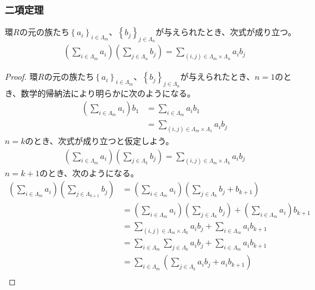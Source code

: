 \documentclass[dvipdfmx]{jsarticle}
\begin{document}
\subsubsection{二項定理}%
\begin{thm}\label{3.3.1.8}
環$R$の元の族たち$\left\{ a_{i} \right\}_{i \in \varLambda_{m}}$、$\left\{ b_{j} \right\}_{j \in \varLambda_{n}}$が与えられたとき、次式が成り立つ。
\begin{align*}
\left( \sum_{i \in \varLambda_{m}} a_{i} \right)\left( \sum_{j \in \varLambda_{n}} b_{j} \right) = \sum_{(i,j) \in \varLambda_{m} \times \varLambda_{n}} {a_{i}b_{j}}
\end{align*}
\end{thm}
\begin{proof}
環$R$の元の族たち$\left\{ a_{i} \right\}_{i \in \varLambda_{m}}$、$\left\{ b_{j} \right\}_{j \in \varLambda_{n}}$が与えられたとき、$n = 1$のとき、数学的帰納法により明らかに次のようになる。
\begin{align*}
\left( \sum_{i \in \varLambda_{m}} a_{i} \right)b_{1} &= \sum_{i \in \varLambda_{m}} {a_{i}b_{1}}\\
&= \sum_{(i,j) \in \varLambda_{m} \times \varLambda_{1}} {a_{i}b_{j}}
\end{align*}
$n = k$のとき、次式が成り立つと仮定しよう。
\begin{align*}
\left( \sum_{i \in \varLambda_{m}} a_{i} \right)\left( \sum_{j \in \varLambda_{k}} b_{j} \right) = \sum_{(i,j) \in \varLambda_{m} \times \varLambda_{k}} {a_{i}b_{j}}
\end{align*}
$n = k + 1$のとき、次のようになる。
\begin{align*}
\left( \sum_{i \in \varLambda_{m}} a_{i} \right)\left( \sum_{j \in \varLambda_{k + 1}} b_{j} \right) &= \left( \sum_{i \in \varLambda_{m}} a_{i} \right)\left( \sum_{j \in \varLambda_{k}} b_{j} + b_{k + 1} \right)\\
&= \left( \sum_{i \in \varLambda_{m}} a_{i} \right)\left( \sum_{j \in \varLambda_{k}} b_{j} \right) + \left( \sum_{i \in \varLambda_{m}} a_{i} \right)b_{k + 1}\\
&= \sum_{(i,j) \in \varLambda_{m} \times \varLambda_{k}} {a_{i}b_{j}} + \sum_{i \in \varLambda_{m}} {a_{i}b_{k + 1}}\\
&= \sum_{i \in \varLambda_{m}} {\sum_{j \in \varLambda_{k}} {a_{i}b_{j}}} + \sum_{i \in \varLambda_{m}} {a_{i}b_{k + 1}}\\
&= \sum_{i \in \varLambda_{m}} \left( \sum_{j \in \varLambda_{k}} {a_{i}b_{j}} + a_{i}b_{k + 1} \right)\\

\end{align*}
\end{proof}
\end{document}
